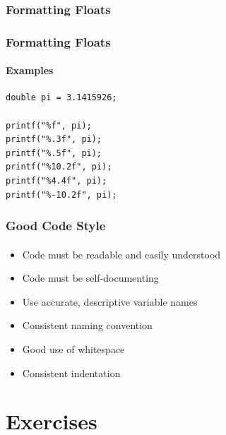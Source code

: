 \documentclass[]{beamer}
\begin{document}
\begin{frame}[fragile]
    \frametitle{Formatting Floats}
    \framesubtitle{}


\end{frame}

\begin{frame}[fragile]
    \frametitle{Formatting Floats}
    \framesubtitle{Examples}
    
\begin{verbatim}
double pi = 3.1415926;

printf("%f", pi);
printf("%.3f", pi);
printf("%.5f", pi);
printf("%10.2f", pi);
printf("%4.4f", pi);
printf("%-10.2f", pi);
\end{verbatim}

\end{frame}

\begin{frame}[fragile]
    \frametitle{Good Code Style}
    \framesubtitle{}

\begin{itemize}[<+->]
  \item Code must be readable and easily understood
  \item Code must be self-documenting
  \item Use accurate, descriptive variable names
  \item Consistent naming convention
  \item Good use of whitespace
  \item Consistent indentation
\end{itemize}

\end{frame}
 
\section{Exercises}
\end{document}
